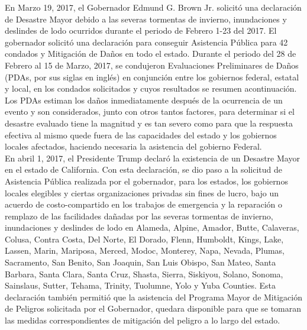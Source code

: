 \documentclass[
10pt, %
spanish,
a4paper, %
twocolumn, %
landscape %
]{article}
\begin{document}
\pagestyle{myheadings} %
\markright{\doctitle} %


\thispagestyle{plain} %

\printtitle %


En Marzo 19, 2017, el Gobernador Edmund G. Brown Jr. solicitó una declaración de Desastre Mayor debido a las severas tormentas de invierno, inundaciones y deslindes de lodo ocurridos durante el periodo de Febrero 1-23 del 2017. El gobernador solicitó una declaración para conseguir Asistencia Pública para 42 condados y Mitigación de Daños en todo el estado. Durante el periodo del 28 de Febrero al 15 de Marzo, 2017, se condujeron Evaluaciones Preliminares de Daños (PDAs, por sus siglas en inglés) en conjunción entre los gobiernos federal, estatal y local, en los condados solicitados y cuyos resultados se resumen acontinuación. Los PDAs estiman los daños inmediatamente después de la ocurrencia de un evento y son considerados, junto con otros tantos factores, para determinar si el desastre evaluado tiene la magnitud y es tan severo como para que la respuesta efectiva al mismo quede fuera de las capacidades del estado y los gobiernos locales afectados, haciendo necesaria la asistencia del gobierno Federal.\\

En abril 1, 2017, el Presidente Trump declaró la existencia de un Desastre Mayor en el estado de California. Con esta declaración, se dio paso a la solicitud de Asistencia Pública realizada por el gobernador, para los estados, los gobiernos locales elegibles y ciertas organizaciones privadas sin fines de lucro, bajo un acuerdo de costo-compartido en los trabajos de emergencia y la reparación o remplazo de las facilidades dañadas por las severas tormentas de invierno, inundaciones y deslindes de lodo en Alameda, Alpine, Amador, Butte, Calaveras, Colusa, Contra Costa, Del Norte, El Dorado, Flenn, Humboldt, Kings, Lake, Lassen, Marin, Mariposa, Merced, Modoc, Monterey, Napa, Nevada, Plumas, Sacramento, San Benito, San Joaquin, San Luis Obispo, San Mateo, Santa Barbara, Santa Clara, Santa Cruz, Shasta, Sierra, Siskiyou, Solano, Sonoma, Sainslaus, Sutter, Tehama, Trinity, Tuolumne, Yolo y Yuba Counties. Esta declaración también permitió que la asistencia del Programa Mayor de Mitigación de Peligros solicitada por el Gobernador, quedara disponible para que se tomaran las medidas correspondientes de mitigación del peligro a lo largo del estado.\\
\end{document}

